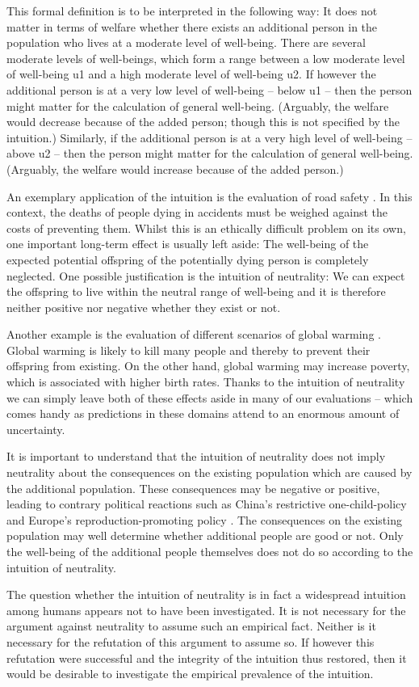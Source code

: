 This formal definition is to be interpreted in the following way: It does not matter in terms of welfare whether there exists an additional person in the population who lives at a moderate level of well-being. There are several moderate levels of well-beings, which form a range between a low moderate level of well-being u1 and a high moderate level of well-being u2. If however the additional person is at a very low level of well-being – below u1 – then the person might matter for the calculation of general well-being. (Arguably, the welfare would decrease because of the added person; though this is not specified by the intuition.) Similarly, if the additional person is at a very high level of well-being – above u2 – then the person might matter for the calculation of general well-being. (Arguably, the welfare would increase because of the added person.) 

An exemplary application of the intuition is the evaluation of road safety \cite[p.~144f]{broome_2004}. In this context, the deaths of people dying in accidents must be weighed against the costs of preventing them. Whilst this is an ethically difficult problem on its own, one important long-term effect is usually left aside: The well-being of the expected potential offspring of the potentially dying person is completely neglected. One possible justification is the intuition of neutrality: We can expect the offspring to live within the neutral range of well-being and it is therefore neither positive nor negative whether they exist or not.  

Another example is the evaluation of different scenarios of global warming \cite[p.~170]{broome_2012}. Global warming is likely to kill many people and thereby to prevent their offspring from existing. On the other hand, global warming may increase poverty, which is associated with higher birth rates. Thanks to the intuition of neutrality we can simply leave both of these effects aside in many of our evaluations – which comes handy as predictions in these domains attend to an enormous amount of uncertainty.  

It is important to understand that the intuition of neutrality does not imply neutrality about the consequences on the existing population which are caused by the additional population. These consequences may be negative or positive, leading to contrary political reactions such as China’s restrictive one-child-policy and Europe’s reproduction-promoting policy \cite[p.~169]{broome_2012}. The consequences on the existing population may well determine whether additional people are good or not. Only the well-being of the additional people themselves does not do so according to the intuition of neutrality.  

The question whether the intuition of neutrality is in fact a widespread intuition among humans appears not to have been investigated. It is not necessary for the argument against neutrality to assume such an empirical fact. Neither is it necessary for the refutation of this argument to assume so. If however this refutation were successful and the integrity of the intuition thus restored, then it would be desirable to investigate the empirical prevalence of the intuition.  